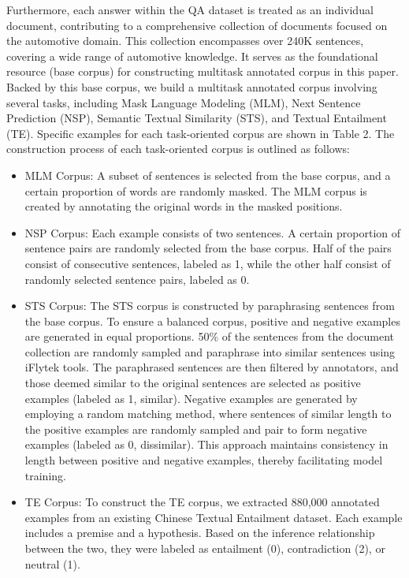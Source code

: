 \documentclass[mathematics,article,submit,moreauthors]{Definitions/mdpi}
\newcommand{\1}[1]{\mathds{1}\left[#1\right]}
\begin{document}
Furthermore, each answer within the QA dataset is treated as an individual document, contributing to a comprehensive collection of documents focused on the automotive domain. This collection encompasses over 240K sentences, covering a wide range of automotive knowledge. It serves as the foundational resource (base corpus) for constructing multitask annotated corpus in this paper.
Backed by this base corpus, we build a multitask annotated corpus involving several tasks, including Mask Language Modeling (MLM), Next Sentence Prediction (NSP), Semantic Textual Similarity (STS), and Textual Entailment (TE). Specific examples for each task-oriented corpus are shown in Table 2.
The construction process of each task-oriented corpus is outlined as follows:
\begin{itemize}
	\item	MLM Corpus: A subset of sentences is selected from the base corpus, and a certain proportion of words are randomly masked. The MLM corpus is created by annotating the original words in the masked positions.
	\item	NSP Corpus: Each example consists of two sentences. A certain proportion of sentence pairs are randomly selected from the base corpus. Half of the pairs consist of consecutive sentences, labeled as 1, while the other half consist of randomly selected sentence pairs, labeled as 0.
	\item STS Corpus: The STS corpus is constructed by paraphrasing sentences from the base corpus. To ensure a balanced corpus, positive and negative examples are generated in equal proportions. 50\% of the sentences from the document collection are randomly sampled and paraphrase into similar sentences using iFlytek tools. The paraphrased sentences are then filtered by annotators, and those deemed similar to the original sentences are selected as positive examples (labeled as 1, similar). Negative examples are generated by employing a random matching method, where sentences of similar length to the positive examples are randomly sampled and pair to form negative examples (labeled as 0, dissimilar). This approach maintains consistency in length between positive and negative examples, thereby facilitating model training.
	\item	TE Corpus: To construct the TE corpus, we extracted 880,000 annotated examples from an existing Chinese Textual Entailment dataset. Each example includes a premise and a hypothesis. Based on the inference relationship between the two, they were labeled as entailment (0), contradiction (2), or neutral (1).
\end{itemize}
\end{document}
